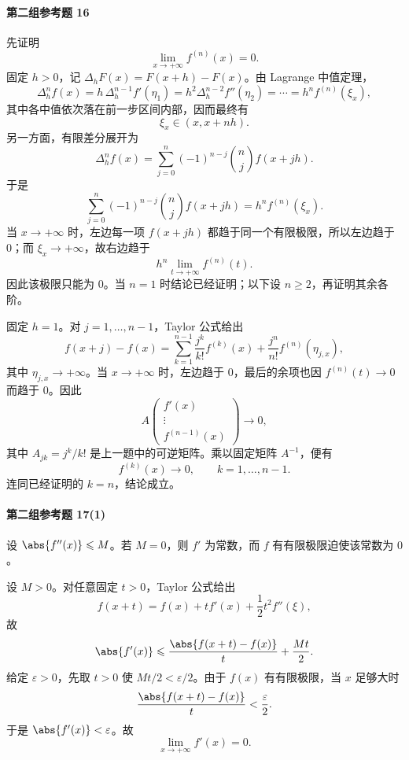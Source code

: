 \paragraph{第二组参考题 16}
\begin{xsolution}
先证明
\[
  \lim_{x\to+\infty}f^{(n)}(x)=0.
\]
固定 $h>0$，记 $\Delta_hF(x)=F(x+h)-F(x)$。由 Lagrange 中值定理，
\[
  \Delta_h^n f(x)
  =h\,\Delta_h^{n-1}f'(\eta_1)
  =h^2\Delta_h^{n-2}f''(\eta_2)
  =\cdots
  =h^n f^{(n)}(\xi_x),
\]
其中各中值依次落在前一步区间内部，因而最终有
\[
  \xi_x\in(x,x+nh).
\]
另一方面，有限差分展开为
\[
  \Delta_h^n f(x)
  =\sum_{j=0}^n(-1)^{n-j}\binom nj f(x+jh).
\]
于是
\[
  \sum_{j=0}^n(-1)^{n-j}\binom nj f(x+jh)
  =h^n f^{(n)}(\xi_x).
\]
当 $x\to+\infty$ 时，左边每一项 $f(x+jh)$ 都趋于同一个有限极限，所以左边趋于 $0$；而 $\xi_x\to+\infty$，故右边趋于
\[
  h^n\lim_{t\to+\infty}f^{(n)}(t).
\]
因此该极限只能为 $0$。当 $n=1$ 时结论已经证明；以下设 $n\geqslant2$，再证明其余各阶。

固定 $h=1$。对 $j=1,\ldots,n-1$，Taylor 公式给出
\[
  f(x+j)-f(x)
  =\sum_{k=1}^{n-1}\frac{j^k}{k!}f^{(k)}(x)
   +\frac{j^n}{n!}f^{(n)}(\eta_{j,x}),
\]
其中 $\eta_{j,x}\to+\infty$。当 $x\to+\infty$ 时，左边趋于 $0$，最后的余项也因 $f^{(n)}(t)\to0$ 而趋于 $0$。因此
\[
  A
  \begin{pmatrix}
  f'(x)\\ \vdots\\ f^{(n-1)}(x)
  \end{pmatrix}
  \longrightarrow0,
\]
其中 $A_{jk}=j^k/k!$ 是上一题中的可逆矩阵。乘以固定矩阵 $A^{-1}$，便有
\[
  f^{(k)}(x)\to0,
  \qquad k=1,\ldots,n-1.
\]
连同已经证明的 $k=n$，结论成立。
\end{xsolution}

\paragraph{第二组参考题 17(1)}
\begin{xsolution}
设 $\abs{f''(x)}\leqslant M$。若 $M=0$，则 $f'$ 为常数，而 $f$ 有有限极限迫使该常数为 $0$。

设 $M>0$。对任意固定 $t>0$，Taylor 公式给出
\[
  f(x+t)=f(x)+tf'(x)+\frac12t^2f''(\xi),
\]
故
\[
  \abs{f'(x)}
  \leqslant\frac{\abs{f(x+t)-f(x)}}t+\frac{Mt}{2}.
\]
给定 $\varepsilon>0$，先取 $t>0$ 使 $Mt/2<\varepsilon/2$。由于 $f(x)$ 有有限极限，当 $x$ 足够大时
\[
  \frac{\abs{f(x+t)-f(x)}}t<\frac\varepsilon2.
\]
于是 $\abs{f'(x)}<\varepsilon$。故
\[
  \lim_{x\to+\infty}f'(x)=0.
\]
\end{xsolution}


